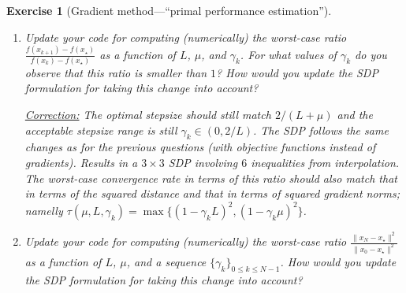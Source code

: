 \documentclass[11pt,a4paper]{article}
\newcommand{\inner}[2]{{\langle #1, #2\rangle}}
\newcommand{\correction}[1]{{{\color{blue}\underline{Correction:} #1}}}
\newcommand{\correction}[1]{}
\newtheorem{exercise}{Exercise}
\begin{document}
\begin{exercise}[Gradient method---``primal performance estimation'']
\begin{enumerate}
{\begin{equation*}
\begin{aligned}
		\text{s.t. } & \exists f\in\mathcal{F}_{\mu,L} \text{ such that }\left\{\begin{array}{ll}
			f_i=f(x_i)\quad & i=k,k+1\\
			g_i=\nabla f(x_i)\quad & i=k,k+1
			\end{array}\right.\\
		& x_{k+1}=x_k-\gamma_k  g_k\\
		& \|g_k\|^2=1,\\
		\end{aligned}
		\end{equation*}
		which can be encoded as a $2\times 2$ SDP using
			\begin{align*}
			G \triangleq \begin{bmatrix}
			\| g_k\|^2 & \inner{ g_{k+1}}{g_k}\\
			\inner{g_k}{g_{k+1}} & \|g_{k+1}\|^2
			\end{bmatrix},\quad 	F \triangleq 			f_{k+1}-f_k,
			\end{align*}
			and hence only $2$ inequalities arising from interpolation constraints.
	}
	
	\item Update your code for computing (numerically) the worst-case ratio $\frac{f(x_{k+1})-f(x_\star)}{f(x_{k})-f(x_\star)}$ as a function of $L$, $\mu$, and $\gamma_k$. For what values of $\gamma_k$ do you observe that this ratio is smaller than $1$? How would you update the SDP formulation for taking this change into account?
	
	\correction{The optimal stepsize should still match $2/(L+\mu)$ and the acceptable stepsize range is still $\gamma_k\in(0,2/L)$. The SDP follows the same changes as for the previous questions (with objective functions instead of gradients). Results in a $3\times 3$ SDP involving $6$ inequalities from interpolation. The worst-case convergence rate in terms of this ratio should also match that in terms of the squared distance and that in terms of squared gradient norms; namelly $\tau(\mu,L,\gamma_k)=\max\{(1-\gamma_k L)^2,(1-\gamma_k\mu)^2\}$.}
	
	\item Update your code for computing (numerically) the worst-case ratio $\frac{\|x_{N}-x_\star\|^2}{\|x_0-x_\star\|^2}$ as a function of $L$, $\mu$, and a sequence $\{\gamma_k\}_{0\leqslant k\leqslant N-1}$. How would you update the SDP formulation for taking this change into account?
	

\end{enumerate}
\end{exercise}
\end{document}
